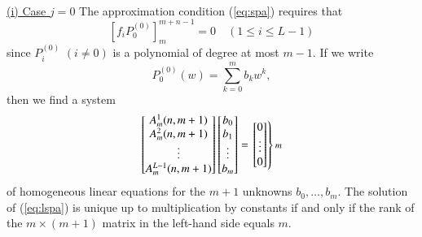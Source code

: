 \documentclass[12pt]{article}
\numberwithin{equation}{section}
\begin{document}
\paragraph{}
\noindent
\underline{(i) Case $j=0$} \quad
The approximation condition (\ref{eq:spa}) requires that
\[
\left[
 f_i  P_0^{(0)}
\right]^{m+n-1}_{m}=0 \quad (1 \leq i \leq L-1)
\]
since $P_i^{(0)}$ $(i \neq 0)$ is a polynomial of degree at most $m-1$.
If we write
\[
P_0^{(0)}(w)=\sum_{k=0}^{ m  } b_{k}w^k,
\]
then we find a system
\begin{equation}  \label{eq:lspa}
\begin{bmatrix}
A^1_{m}(n,m+1) 
\\
A^2_{m}(n,m+1) 
\\
\vdots
\\
A^{L-1}_{m}(n,m+1) 
\end{bmatrix}
\begin{bmatrix} 
b_0 \\b_1 \\ \vdots \\b_{m}
\end{bmatrix}
=
\left.
\begin{bmatrix} 
0  \\ \vdots \\0
\end{bmatrix}
\right\} \text{\footnotesize $m$}
\end{equation}
of homogeneous linear equations for the $m+1$ unknowns 
$b_0, \ldots, b_{m}$. 
The solution of (\ref{eq:lspa}) is unique up to multiplication by constants if and only if
the rank of the $m \times (m+1)$ matrix in the left-hand side equals $m$.
\end{document}
